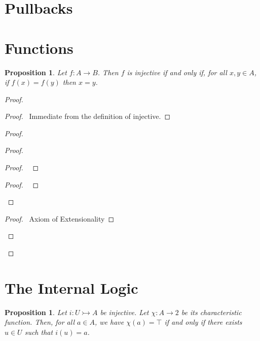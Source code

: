 \documentclass{book}
\let\qed\relax
\newtheorem{prop}[ax]{Proposition}
\theoremstyle{definition}
\begin{document}
\section{Pullbacks}


\section{Functions}

\begin{prop}
Let $f : A \rightarrow B$. Then $f$ is injective if and only if, for all $x, y \in A$, if $f(x) = f(y)$ then $x = y$.
\end{prop}

\begin{proof}
\pf
{}
\begin{proof}
	\pf\ Immediate from the definition of injective.
\end{proof}
\begin{proof}
	\begin{proof}
		\begin{proof}
			\pf\ 
		\end{proof}
		\begin{proof}
			\pf\ 
		\end{proof}
	\end{proof}
	\begin{proof}
		\pf\ Axiom of Extensionality
	\end{proof}
\end{proof}
\qed
\end{proof}

\section{The Internal Logic}

\begin{prop}
\label{prop:charfun}
Let $i : U \rightarrowtail A$ be injective. Let $\chi : A \rightarrow 2$ be its characteristic function. Then, for all $a \in A$, we have $\chi(a) = \top$ if and only if there exists $u \in U$ such that $i(u) = a$.
\end{prop}
\end{document}
